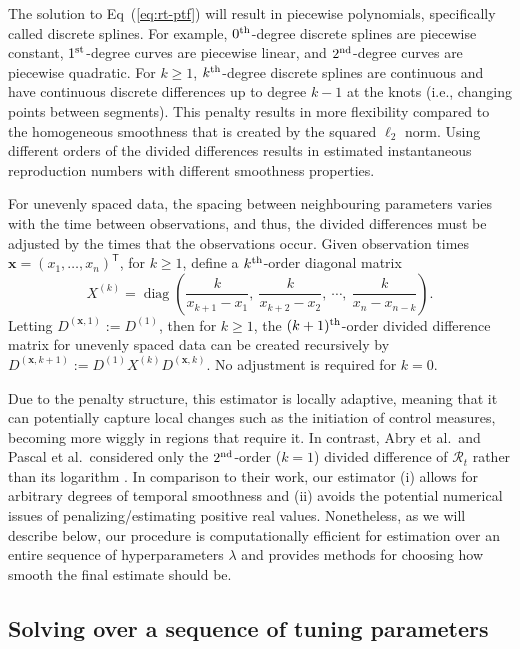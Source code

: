 \documentclass[10pt,letterpaper]{article}
\newcommand{\lr}[1]{\left(#1\right)}
\DeclareMathOperator*{\diag}{diag}
\def\bfx{\mathbf{x}}
\def\calR{\mathcal{R}}
\renewcommand{\top}{\mathsf{T}}
\def\th{^{\textnormal{th}}}
\def\first{$1^{\textnormal{st}}$}
\def\second{$2^{\textnormal{nd}}$}
\renewcommand{\eqref}[1]{Eq~(\ref{#1})}
\begin{document}
The solution to \eqref{eq:rt-ptf} will result in piecewise
polynomials, specifically called discrete splines. For example, $0\th$-degree
discrete splines are piecewise constant, \first-degree curves are piecewise
linear, and \second-degree curves are piecewise quadratic. For $k\geq 1$,
$k\th$-degree discrete splines are continuous and have continuous discrete
differences up to degree $k-1$ at the knots (i.e., changing points between segments). This penalty results in more
flexibility compared to the homogeneous smoothness that is created by the
squared $\ell_2$ norm. Using different orders of the divided differences results in
estimated instantaneous reproduction numbers with different smoothness properties. 



For unevenly spaced data, the spacing between neighbouring parameters
varies with the time between observations, and thus, the divided differences
must be adjusted by the times that the observations occur. Given observation
times $\bfx = {(x_1,\dots,x_n)}^\top$, for $k \geq 1$, define a $k\th$-order
diagonal matrix 
\begin{equation}
  X^{(k)} = \diag \lr{\frac{k}{x_{k+1} - x_1},\ \frac{k}{x_{k+2} - x_2},\ 
  \cdots,\ \frac{k}{x_n - x_{n-k}} }.
\end{equation}
Letting $D^{(\bfx,1)} := D^{(1)}$,
then for $k\geq 1$, the $(k+1)\th$-order divided difference matrix for unevenly
spaced data can be created recursively by
$D^{(\bfx, k+1)} := D^{(1)} X^{(k)} D^{(\bfx,k)}.$ No adjustment is required
for $k=0$. 


Due to the penalty structure, this estimator is locally adaptive, meaning that
it can potentially capture local changes such as the initiation of control
measures, becoming more wiggly in regions that require it. In contrast, Abry et
al.\ and Pascal et al.\ considered only the \second-order ($k = 1$) divided
difference of $\calR_t$ rather than its logarithm
\cite{abry2020spatial,pascal2022nonsmooth}. In comparison to their work, our
estimator (i) allows for arbitrary degrees of temporal smoothness and (ii)
avoids the potential numerical issues of penalizing/estimating positive real
values. Nonetheless, as we will describe below, our procedure is computationally
efficient for estimation over an entire sequence of hyperparameters $\lambda$
and provides methods for choosing how smooth the final estimate should be.


\subsection{Solving over a sequence of tuning parameters}
\label{sec:candidate-set}
\end{document}
